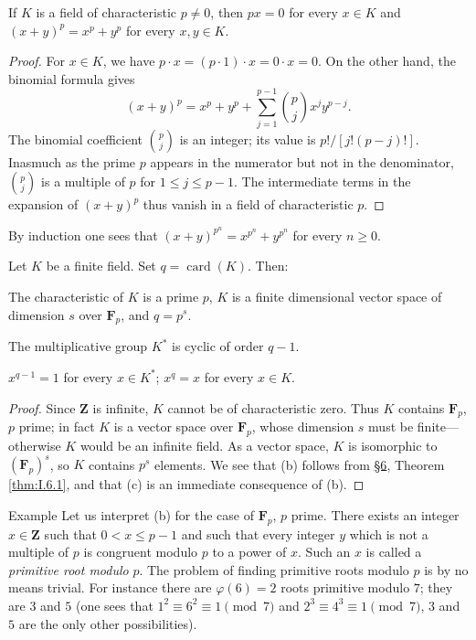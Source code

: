 \begin{proposition}
\label{prop:I.7.1}
If $K$ is a field of characteristic $p\neq0$, then $px=0$ for every $x\in K$
and $(x+y)^{p}=x^{p}+y^{p}$ for every $x,y\in K$.
\end{proposition}

\begin{proof}
For $x\in K$, we have $p\cdot x=(p\cdot1)\cdot x=0\cdot x=0$. On the other
hand, the binomial formula gives
\[
(x+y)^{p}=x^{p}+y^{p}+\sum_{j=1}^{p-1}\binom{p}{j}x^{j}y^{p-j}.
\]
The binomial coefficient $\binom{p}{j}$ is an integer; its value is
$p!/[j!(p-j)!]$. Inasmuch as the prime $p$ appears in the numerator but not
in the denominator, $\binom{p}{j}$ is a multiple of $p$ for
$1\leq j\leq p-1$. The intermediate terms in the expansion of $(x+y)^{p}$
thus vanish in a field of characteristic $p$.
\end{proof}

By induction one sees that $(x+y)^{p^{n}}=x^{p^{n}}+y^{p^{n}}$ for every
$n\geq0$.

\begin{theorem}
\label{thm:I.7.1}
Let $K$ be a finite field. Set $q=\operatorname{card}(K)$. Then:
\begin{alist}
\item The characteristic of $K$ is a prime $p$, $K$ is a finite dimensional
vector space of dimension $s$ over $\mathbf{F}_{p}$, and $q=p^{s}$.
\item The multiplicative group $K^{*}$ is cyclic of order $q-1$.
\item $x^{q-1}=1$ for every $x\in K^{*}$; $x^{q}=x$ for every $x\in K$.
\end{alist}
\end{theorem}

\begin{proof}
Since $\mathbf{Z}$ is infinite, $K$ cannot be of characteristic zero. Thus
$K$ contains $\mathbf{F}_{p}$, $p$ prime; in fact $K$ is a vector space over
$\mathbf{F}_{p}$, whose dimension $s$ must be finite---otherwise $K$ would
be an infinite field. As a vector space, $K$ is isomorphic to
$(\mathbf{F}_{p})^{s}$, so $K$ contains $p^{s}$ elements. We see that (b)
follows from \hyperref[sec:1.6]{§6}, Theorem \ref{thm:I.6.1}, and that (c) is an immediate
consequence of (b).
\end{proof}

\begin{statement}{Example}
Let us interpret (b) for the case of $\mathbf{F}_{p}$, $p$ prime. There
exists an integer $x\in\mathbf{Z}$ such that $0<x\leq p-1$ and such that
every integer $y$ which is not a multiple of $p$ is congruent modulo $p$ to
a power of $x$. Such an $x$ is called a \emph{primitive root modulo} $p$.
The problem of finding primitive roots modulo $p$ is by no means trivial.
For instance there are $\varphi(6)=2$ roots primitive modulo $7$; they are
$3$ and $5$ (one sees that $1^{2}\equiv6^{2}\equiv1\pmod{7}$ and
$2^{3}\equiv4^{3}\equiv1\pmod{7}$, $3$ and $5$ are the only other
possibilities).
\end{statement}

